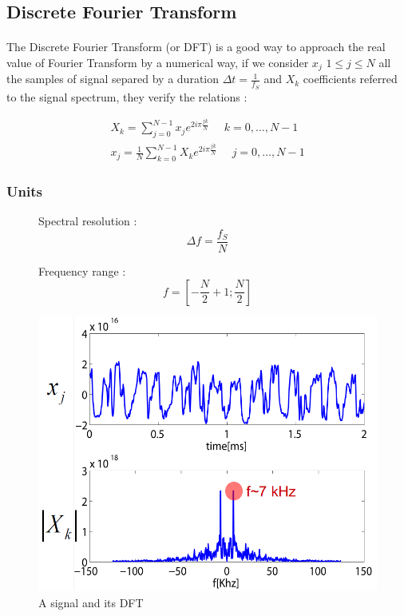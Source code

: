 \subsection{Discrete Fourier Transform}

\paragraph{}
The Discrete Fourier Transform (or DFT) is a good way to approach the real value of Fourier Transform by a numerical way, if we consider \(x_j\) \(1 \leq j \leq N\) all the samples of signal separed by a duration \(\Delta t = \frac{1}{f_S}\) and \(X_k\) coefficients referred to the signal spectrum, they verify the relations : 

\begin{gather}
    X_k = \sum_{j=0}^{N-1} x_j e^{2i\pi \frac{j k}{N}} ~~~~~~k=0,\dots,N-1 \\
    x_j = \frac{1}{N}\sum_{k=0}^{N-1} X_k e^{2i\pi \frac{j k}{N}} ~~~~~~ j=0,\dots, N-1
\end{gather}

\subsubsection{Units}

\begin{figure}[h]
    \begin{minipage}{0.5\textwidth}
        Spectral resolution :
    \begin{equation*}
    \Delta f = \frac{f_S}{N}
    \end{equation*}

    Frequency range :
    \begin{equation*}
        f=\left[- \frac{N}{2} +1 ; \frac{N}{2} \right]
    \end{equation*}
    \end{minipage}
    \begin{minipage}{0.5\textwidth}
    \includegraphics[scale=0.4]{Figures Cours Traitement du Signal/Units of DFT.png}
    \caption{A signal and its DFT}
    \label{fig:DFT example}
    \end{minipage}
\end{figure}


